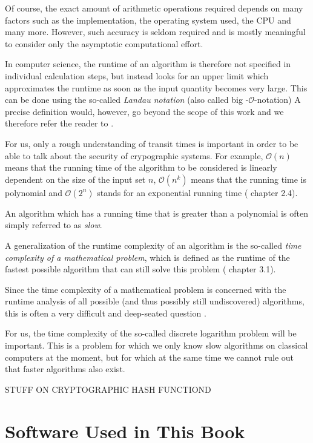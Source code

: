 Of course, the exact amount of arithmetic operations required depends on many factors such as the implementation, the operating system used, the CPU and many more. However, such accuracy is seldom required and is mostly meaningful to consider only the asymptotic computational effort.

In computer science, the runtime of an algorithm is therefore not specified in individual calculation steps, but instead looks for an upper limit which approximates the runtime as soon as the input quantity becomes very large. This can be done using the so-called \textit{Landau notation} (also called big -$\mathcal{O}$-notation) A precise definition
would, however, go beyond the scope of this work and we therefore refer the reader to 
.

For us, only a rough understanding of transit times is important in order to be able to talk about the security of crypographic systems. For example, $\mathcal{O}(n)$ means that the running time of the algorithm to be considered is linearly dependent on the size of the input set $n$, $\mathcal{O}(n^k)$ means that the running time is polynomial and $\mathcal{O}(2^n) $ stands for an exponential running time (%
chapter 2.4).


An algorithm which has a running time that is greater than a polynomial is often simply referred to as \textit{slow}.

A generalization of the runtime complexity of an algorithm is the so-called \textit{time complexity of a mathematical problem}, which is defined as the runtime of the fastest possible algorithm that can still solve this problem (
chapter 3.1).

Since the time complexity of a mathematical problem is concerned with the runtime analysis of all possible (and thus possibly still undiscovered) algorithms, this is often a very difficult and deep-seated question .

For us, the time complexity of the so-called discrete logarithm problem will be important. This is a problem for which we only know slow algorithms on classical computers at the moment, but for which at the same time we cannot rule out that faster algorithms also exist.
 

STUFF ON CRYPTOGRAPHIC HASH FUNCTIOND


\section{Software Used in This Book}

